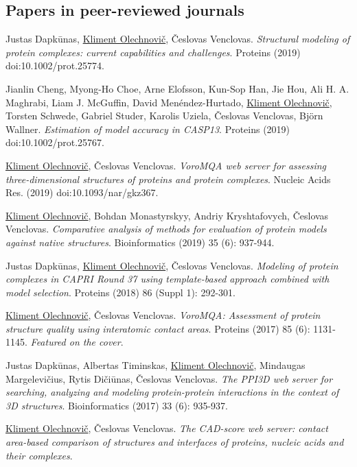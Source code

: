 \documentclass{article}
\newenvironment{enumerate_tight}{
\begin{enumerate}
  \setlength{\itemsep}{4pt}
  \setlength{\parskip}{0pt}
  \setlength{\parsep}{0pt}
}{\end{enumerate}}
\begin{document}
\subsection*{Papers in peer-reviewed journals}
\begin{enumerate_tight}
  \item Justas Dapkūnas, \underline{Kliment Olechnovič}, Česlovas Venclovas.
        \emph{Structural modeling of protein complexes: current capabilities and challenges}.
        Proteins (2019) doi:10.1002/prot.25774.
  \item Jianlin Cheng, Myong-Ho Choe, Arne Elofsson, Kun-Sop Han, Jie Hou, Ali H. A. Maghrabi, Liam J. McGuffin, David Menéndez-Hurtado, \underline{Kliment Olechnovič}, Torsten Schwede, Gabriel Studer, Karolis Uziela, Česlovas Venclovas, Björn Wallner.
        \emph{Estimation of model accuracy in CASP13}.
        Proteins (2019) doi:10.1002/prot.25767.
  \item \underline{Kliment Olechnovič}, Česlovas Venclovas.
        \emph{VoroMQA web server for assessing three-dimensional structures of proteins and protein complexes}.
        Nucleic Acids Res. (2019) doi:10.1093/nar/gkz367.
  \item \underline{Kliment Olechnovič}, Bohdan Monastyrskyy, Andriy Kryshtafovych, Česlovas Venclovas.
        \emph{Comparative analysis of methods for evaluation of protein models against native structures}.
        Bioinformatics (2019) 35 (6): 937-944.
  \item Justas Dapkūnas, \underline{Kliment Olechnovič}, Česlovas Venclovas.
        \emph{Modeling of protein complexes in CAPRI Round 37 using template-based approach combined with model selection}.
        Proteins (2018) 86 (Suppl 1): 292-301.
  \item \underline{Kliment Olechnovič}, Česlovas Venclovas.
        \emph{VoroMQA: Assessment of protein structure quality using interatomic contact areas}.
        Proteins (2017) 85 (6): 1131-1145. \emph{Featured on the cover}.
  \item Justas Dapkūnas, Albertas Timinskas, \underline{Kliment Olechnovič}, Mindaugas Margelevičius, Rytis Dičiūnas, Česlovas Venclovas.
        \emph{The PPI3D web server for searching, analyzing and modeling protein-protein interactions in the context of 3D structures}.
        Bioinformatics (2017) 33 (6): 935-937.
  \item \underline{Kliment Olechnovič}, Česlovas Venclovas.
        \emph{The CAD-score web server: contact area-based comparison of structures and interfaces of proteins, nucleic acids and their complexes}.

\end{enumerate_tight}
\end{document}

